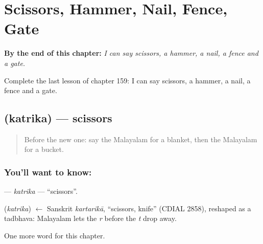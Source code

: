 
\chapter{Scissors, Hammer, Nail, Fence, Gate}
\label{ch:ml-scissors-hammer-nail-fence-gate}

\begin{chapteropening}
\textbf{By the end of this chapter:} \emph{I can say scissors, a hammer, a nail, a fence and a gate.}

Complete the last lesson of chapter 159: I can say scissors, a hammer, a nail, a fence and a gate.
\end{chapteropening}

\section[\texorpdfstring{\ml{കത്രിക} (katrika)}{കത്രിക (katrika)}]{ (katrika) — scissors}

\label{lesson:ML-C159-katrika}



\begin{quote}
Before the new one: say the Malayalam for a blanket, then the Malayalam for a bucket.
\end{quote}

\subsection*{You'll want to know: }
\textbf{} — \emph{katrika} — \textquotedblleft{}scissors\textquotedblright{}.

\begin{cousinweb}
\textbf{} (\emph{katrika}) $\leftarrow$ Sanskrit \emph{kartarikā}, \textquotedblleft{}scissors, knife\textquotedblright{} (CDIAL 2858), reshaped as a tadbhava: Malayalam lets the \emph{r} before the \emph{t} drop away.
\end{cousinweb}

\begin{grammarlens}[title={What you've built}]
One more word for this chapter.
\end{grammarlens}

